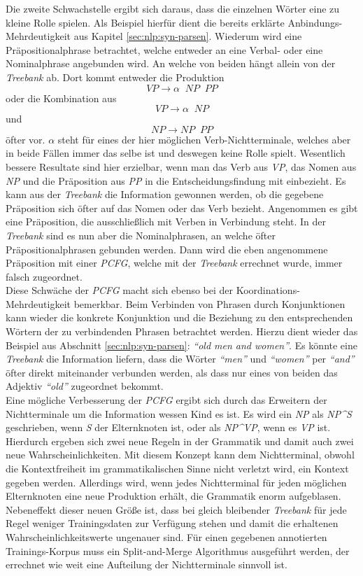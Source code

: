 Die zweite Schwachstelle ergibt sich daraus, dass die einzelnen Wörter eine zu kleine Rolle spielen. Als Beispiel hierfür dient die bereits erklärte Anbindungs-Mehrdeutigkeit aus Kapitel \ref{sec:nlp:syn-parsen}. Wiederum wird eine Präpositionalphrase betrachtet, welche entweder an eine Verbal- oder eine Nominalphrase angebunden wird. An welche von beiden hängt allein von der \textit{Treebank} ab. Dort kommt entweder die Produktion \[ VP  \to  \alpha \;\;  NP \;\; PP \] oder die Kombination aus \[ VP  \to  \alpha \;\; NP \] und \[ NP  \to  NP \;\; PP \] öfter vor. \( \alpha \) steht für eines der hier möglichen Verb-Nichtterminale, welches aber in beide Fällen immer das selbe ist und deswegen keine Rolle spielt. Wesentlich bessere Resultate sind hier erzielbar, wenn man das Verb aus \textit{VP}, das Nomen aus \textit{NP} und die Präposition aus \textit{PP} in die Entscheidungsfindung mit einbezieht. Es kann aus der \textit{Treebank} die Information gewonnen werden, ob die gegebene Präposition sich öfter auf das Nomen oder das Verb bezieht. Angenommen es gibt eine Präposition, die ausschließlich mit Verben in Verbindung steht. In der \textit{Treebank} sind es nun aber die Nominalphrasen, an welche öfter Präpositionalphrasen gebunden werden. Dann wird die eben angenommene Präposition mit einer \textit{PCFG}, welche mit der \textit{Treebank} errechnet wurde, immer falsch zugeordnet. \\ 
Diese Schwäche der \textit{PCFG} macht sich ebenso bei der Koordinations-Mehrdeutigkeit bemerkbar. Beim Verbinden von Phrasen durch Konjunktionen kann wieder die konkrete Konjunktion und die Beziehung zu den entsprechenden Wörtern der zu verbindenden Phrasen betrachtet werden. Hierzu dient wieder das Beispiel aus Abschnitt \ref{sec:nlp:syn-parsen}: \textit{``old men and women''}. Es könnte eine \textit{Treebank} die Information liefern, dass die Wörter \textit{``men''} und \textit{``women''} per \textit{``and''} öfter direkt miteinander verbunden werden, als dass nur eines von beiden das Adjektiv \textit{``old''} zugeordnet bekommt. \\
Eine mögliche Verbesserung der \textit{PCFG} ergibt sich durch das Erweitern der Nichtterminale um die Information wessen Kind es ist. Es wird ein \textit{NP} als \textit{NP\^{}S} geschrieben, wenn \textit{S} der Elternknoten ist, oder als \textit{NP\^{}VP}, wenn es \textit{VP} ist. Hierdurch ergeben sich zwei neue Regeln in der Grammatik und damit auch zwei neue Wahrscheinlichkeiten. Mit diesem Konzept kann dem Nichtterminal, obwohl die Kontextfreiheit im grammatikalischen Sinne nicht verletzt wird, ein Kontext gegeben werden. Allerdings wird, wenn jedes Nichtterminal für jeden möglichen Elternknoten eine neue Produktion erhält, die Grammatik enorm aufgeblasen. Nebeneffekt dieser neuen Größe ist, dass bei gleich bleibender \textit{Treebank} für jede Regel weniger Trainingsdaten zur Verfügung stehen und damit die erhaltenen Wahrscheinlichkeitswerte ungenauer sind. Für einen gegebenen annotierten Trainings-Korpus muss ein Split-and-Merge Algorithmus ausgeführt werden, der errechnet wie weit eine Aufteilung der Nichtterminale sinnvoll ist.

